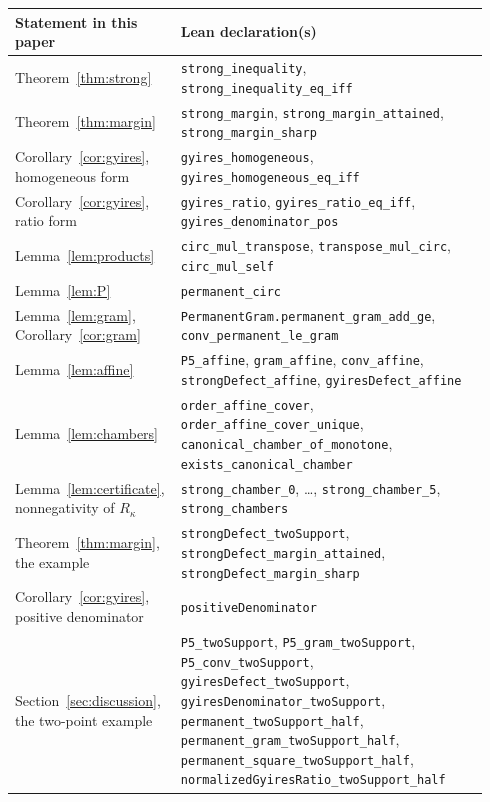 \documentclass[11pt,a4paper]{article}
\theoremstyle{definition}
\theoremstyle{remark}
\newcommand{\lean}[1]{\texttt{#1}}
\begin{document}
\begin{center}\small\renewcommand{\arraystretch}{1.25}
\begin{tabular}{>{\raggedright\arraybackslash}p{0.30\linewidth}>{\raggedright\arraybackslash}p{0.64\linewidth}}
\toprule
Statement in this paper & Lean declaration(s)\\
\midrule
Theorem~\ref{thm:strong} & \lean{strong\_inequality}, \lean{strong\_inequality\_eq\_iff} \\
Theorem~\ref{thm:margin} & \lean{strong\_margin}, \lean{strong\_margin\_attained}, \lean{strong\_margin\_sharp} \\
Corollary~\ref{cor:gyires}, homogeneous form & \lean{gyires\_homogeneous}, \lean{gyires\_homogeneous\_eq\_iff} \\
Corollary~\ref{cor:gyires}, ratio form & \lean{gyires\_ratio}, \lean{gyires\_ratio\_eq\_iff}, \lean{gyires\_denominator\_pos} \\
\midrule
Lemma~\ref{lem:products} & \lean{circ\_mul\_transpose}, \lean{transpose\_mul\_circ}, \lean{circ\_mul\_self} \\
Lemma~\ref{lem:P} & \lean{permanent\_circ} \\
Lemma~\ref{lem:gram}, Corollary~\ref{cor:gram} & \lean{PermanentGram.permanent\_gram\_add\_ge}, \lean{conv\_permanent\_le\_gram} \\
Lemma~\ref{lem:affine} & \lean{P5\_affine}, \lean{gram\_affine}, \lean{conv\_affine}, \lean{strongDefect\_affine}, \lean{gyiresDefect\_affine} \\
Lemma~\ref{lem:chambers} & \lean{order\_affine\_cover}, \lean{order\_affine\_cover\_unique}, \lean{canonical\_chamber\_of\_monotone}, \lean{exists\_canonical\_chamber} \\
Lemma~\ref{lem:certificate}, nonnegativity of $R_\kappa$ & \lean{strong\_chamber\_0}, \dots, \lean{strong\_chamber\_5}, \lean{strong\_chambers} \\
Theorem~\ref{thm:margin}, the example & \lean{strongDefect\_twoSupport}, \lean{strongDefect\_margin\_attained}, \lean{strongDefect\_margin\_sharp} \\
Corollary~\ref{cor:gyires}, positive denominator & \lean{positiveDenominator} \\
Section~\ref{sec:discussion}, the two-point example & \lean{P5\_twoSupport}, \lean{P5\_gram\_twoSupport}, \lean{P5\_conv\_twoSupport}, \lean{gyiresDefect\_twoSupport}, \lean{gyiresDenominator\_twoSupport},  \lean{permanent\_twoSupport\_half}, \lean{permanent\_gram\_twoSupport\_half}, \lean{permanent\_square\_twoSupport\_half}, \lean{normalizedGyiresRatio\_twoSupport\_half} \\
\bottomrule
\end{tabular}
\end{center}
\end{document}
